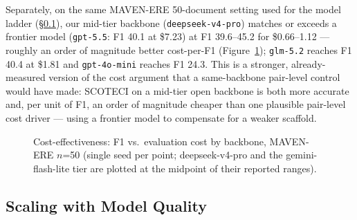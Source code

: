 \documentclass[11pt]{article}
\newcommand{\method}{SCOTECI}
\begin{document}
Separately, on the same MAVEN-ERE 50-document setting used for the model ladder
(\S\ref{sec:scaling}), our mid-tier backbone (\texttt{deepseek-v4-pro}) matches or
exceeds a frontier model (\texttt{gpt-5.5}: F1 40.1 at \$7.23) at F1 39.6--45.2 for
\$0.66--1.12 --- roughly an order of magnitude better cost-per-F1
(Figure~\ref{fig:cost}); \texttt{glm-5.2} reaches F1 40.4 at \$1.81 and
\texttt{gpt-4o-mini} reaches F1 24.3. This is a stronger, already-measured version
of the cost argument that a same-backbone pair-level control would have made:
\method{} on a mid-tier open backbone is both more accurate and, per unit of F1,
an order of magnitude cheaper than one plausible pair-level cost driver --- using
a frontier model to compensate for a weaker scaffold.

\begin{figure}[t]
  \centering
  \caption{Cost-effectiveness: F1 vs.\ evaluation cost by backbone, MAVEN-ERE
  $n$=50 (single seed per point; deepseek-v4-pro and the gemini-flash-lite tier
  are plotted at the midpoint of their reported ranges).}
  \label{fig:cost}
\end{figure}

\subsection{Scaling with Model Quality}
\label{sec:scaling}
\end{document}
